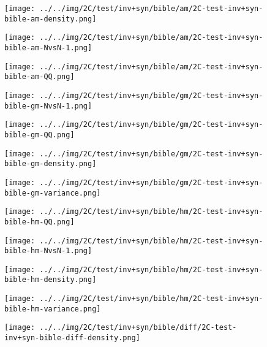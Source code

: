 \begin{figure}[H]
\centering	\texttt{[image: ../../img/2C/test/inv+syn/bible/am/2C-test-inv+syn-bible-am-density.png]}
\end{figure}
\begin{figure}[H]
\centering	\texttt{[image: ../../img/2C/test/inv+syn/bible/am/2C-test-inv+syn-bible-am-NvsN-1.png]}
\end{figure}
\begin{figure}[H]
\centering	\texttt{[image: ../../img/2C/test/inv+syn/bible/am/2C-test-inv+syn-bible-am-QQ.png]}
\end{figure}
\begin{figure}[H]
\centering	\texttt{[image: ../../img/2C/test/inv+syn/bible/gm/2C-test-inv+syn-bible-gm-NvsN-1.png]}
\end{figure}
\begin{figure}[H]
\centering	\texttt{[image: ../../img/2C/test/inv+syn/bible/gm/2C-test-inv+syn-bible-gm-QQ.png]}
\end{figure}
\begin{figure}[H]
\centering	\texttt{[image: ../../img/2C/test/inv+syn/bible/gm/2C-test-inv+syn-bible-gm-density.png]}
\end{figure}
\begin{figure}[H]
\centering	\texttt{[image: ../../img/2C/test/inv+syn/bible/gm/2C-test-inv+syn-bible-gm-variance.png]}
\end{figure}
\begin{figure}[H]
\centering	\texttt{[image: ../../img/2C/test/inv+syn/bible/hm/2C-test-inv+syn-bible-hm-QQ.png]}
\end{figure}
\begin{figure}[H]
\centering	\texttt{[image: ../../img/2C/test/inv+syn/bible/hm/2C-test-inv+syn-bible-hm-NvsN-1.png]}
\end{figure}
\begin{figure}[H]
\centering	\texttt{[image: ../../img/2C/test/inv+syn/bible/hm/2C-test-inv+syn-bible-hm-density.png]}
\end{figure}
\begin{figure}[H]
\centering	\texttt{[image: ../../img/2C/test/inv+syn/bible/hm/2C-test-inv+syn-bible-hm-variance.png]}
\end{figure}
\begin{figure}[H]
\centering	\texttt{[image: ../../img/2C/test/inv+syn/bible/diff/2C-test-inv+syn-bible-diff-density.png]}
\end{figure}
